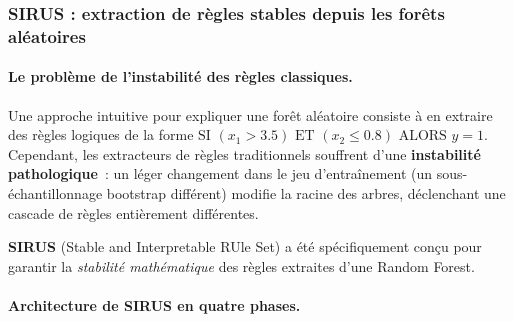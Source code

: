 \subsubsection{SIRUS : extraction de règles stables depuis les forêts aléatoires}

\paragraph{Le problème de l'instabilité des règles classiques.}

Une approche intuitive pour expliquer une forêt aléatoire consiste à en extraire des
règles logiques de la forme $\text{SI } (x_1 > 3.5) \text{ ET } (x_2 \leq 0.8) \text{ ALORS } y = 1$.
Cependant, les extracteurs de règles traditionnels souffrent d'une \textbf{instabilité
pathologique}~: un léger changement dans le jeu d'entraînement (un sous-échantillonnage
bootstrap différent) modifie la racine des arbres, déclenchant une cascade de règles
entièrement différentes.

\textbf{SIRUS} (Stable and Interpretable RUle Set) a été spécifiquement conçu pour
garantir la \textit{stabilité mathématique} des règles extraites d'une Random Forest.

\paragraph{Architecture de SIRUS en quatre phases.}

